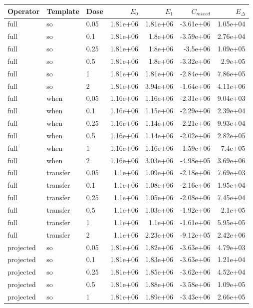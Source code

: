 \begin{center}\scriptsize\begin{tabular}{lllrrrr}
\toprule Operator & Template & Dose & $E_0$ & $E_1$ & $C_{mixed}$ & $E_\Delta$\\
\midrule
full & so & 0.05 & 1.81e+06 & 1.81e+06 & -3.61e+06 & 1.05e+04\\
full & so & 0.1 & 1.81e+06 & 1.8e+06 & -3.59e+06 & 2.76e+04\\
full & so & 0.25 & 1.81e+06 & 1.8e+06 & -3.5e+06 & 1.09e+05\\
full & so & 0.5 & 1.81e+06 & 1.8e+06 & -3.32e+06 & 2.9e+05\\
full & so & 1 & 1.81e+06 & 1.81e+06 & -2.84e+06 & 7.86e+05\\
full & so & 2 & 1.81e+06 & 3.94e+06 & -1.64e+06 & 4.11e+06\\
full & when & 0.05 & 1.16e+06 & 1.16e+06 & -2.31e+06 & 9.04e+03\\
full & when & 0.1 & 1.16e+06 & 1.15e+06 & -2.29e+06 & 2.39e+04\\
full & when & 0.25 & 1.16e+06 & 1.14e+06 & -2.21e+06 & 9.93e+04\\
full & when & 0.5 & 1.16e+06 & 1.14e+06 & -2.02e+06 & 2.82e+05\\
full & when & 1 & 1.16e+06 & 1.16e+06 & -1.59e+06 & 7.4e+05\\
full & when & 2 & 1.16e+06 & 3.03e+06 & -4.98e+05 & 3.69e+06\\
full & transfer & 0.05 & 1.1e+06 & 1.09e+06 & -2.18e+06 & 7.69e+03\\
full & transfer & 0.1 & 1.1e+06 & 1.08e+06 & -2.16e+06 & 1.95e+04\\
full & transfer & 0.25 & 1.1e+06 & 1.05e+06 & -2.08e+06 & 7.45e+04\\
full & transfer & 0.5 & 1.1e+06 & 1.03e+06 & -1.92e+06 & 2.1e+05\\
full & transfer & 1 & 1.1e+06 & 1.1e+06 & -1.61e+06 & 5.95e+05\\
full & transfer & 2 & 1.1e+06 & 2.23e+06 & -9.12e+05 & 2.42e+06\\
projected & so & 0.05 & 1.81e+06 & 1.82e+06 & -3.63e+06 & 4.79e+03\\
projected & so & 0.1 & 1.81e+06 & 1.83e+06 & -3.63e+06 & 1.21e+04\\
projected & so & 0.25 & 1.81e+06 & 1.85e+06 & -3.62e+06 & 4.52e+04\\
projected & so & 0.5 & 1.81e+06 & 1.88e+06 & -3.58e+06 & 1.09e+05\\
projected & so & 1 & 1.81e+06 & 1.89e+06 & -3.43e+06 & 2.66e+05\\

\end{tabular}
\end{center}
